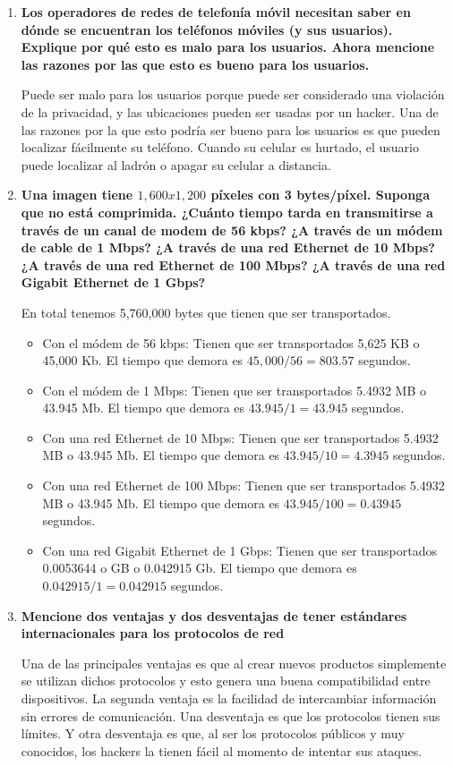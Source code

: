 \documentclass[a4paper,12pt]{article}
\begin{document}
\begin{enumerate}
 \item \textbf{Los operadores de redes de telefonía móvil necesitan saber en dónde se encuentran los teléfonos móviles (y
sus usuarios). Explique por qué esto es malo para los usuarios. Ahora mencione las razones por las que esto es
bueno para los usuarios.}

Puede ser malo para los usuarios porque puede ser considerado una violación de la privacidad, y las ubicaciones pueden ser usadas por un hacker.
Una de las razones por la que esto podría ser bueno para los usuarios es que pueden localizar fácilmente su teléfono. Cuando su celular es hurtado, el usuario
puede localizar al ladrón o apagar su celular a distancia.

 \item \textbf{Una imagen tiene $1,600 x 1,200$ píxeles con 3 bytes/píxel. Suponga que no está comprimida. ¿Cuánto tiempo
tarda en transmitirse a través de un canal de modem de 56 kbps? ¿A través de un módem de cable de 1 Mbps?
¿A través de una red Ethernet de 10 Mbps? ¿A través de una red Ethernet de 100 Mbps? ¿A través de una red
Gigabit Ethernet de 1 Gbps?}
 
En total tenemos 5,760,000 bytes que tienen que ser transportados.
 
\begin{itemize}
 \item Con el módem de 56 kbps: Tienen que ser transportados 5,625 KB o 45,000 Kb. El tiempo que demora es $45,000 / 56 = 803.57$ segundos.
 \item Con el módem de 1 Mbps: 	Tienen que ser transportados 5.4932 MB o 43.945 Mb. El tiempo que demora es $43.945 / 1 = 43.945$ segundos.
 \item Con una red Ethernet de 10 Mbps: Tienen que ser transportados 5.4932 MB o 43.945 Mb. El tiempo que demora es $43.945 / 10 = 4.3945$ segundos.
 \item Con una red Ethernet de 100 Mbps: Tienen que ser transportados 5.4932 MB o 43.945 Mb. El tiempo que demora es $43.945 / 100 = 0.43945$ segundos.
 \item Con una red Gigabit Ethernet de 1 Gbps: Tienen que ser transportados 0.0053644 o GB o 0.042915 Gb. El tiempo que demora es $0.042915 / 1 = 0.042915$ segundos.
\end{itemize}

 \item \textbf{Mencione dos ventajas y dos desventajas de tener estándares internacionales para los protocolos de red}
 
 Una de las principales ventajas es que al crear nuevos productos simplemente se utilizan dichos protocolos y esto genera una buena compatibilidad entre dispositivos. La segunda ventaja
 es la facilidad de intercambiar información sin errores de comunicación. Una desventaja es que los protocolos tienen sus límites. Y otra desventaja es que, al ser los protocolos
 públicos y muy conocidos, los hackers la tienen fácil al momento de intentar sus ataques.
 

\end{enumerate}
\end{document}
